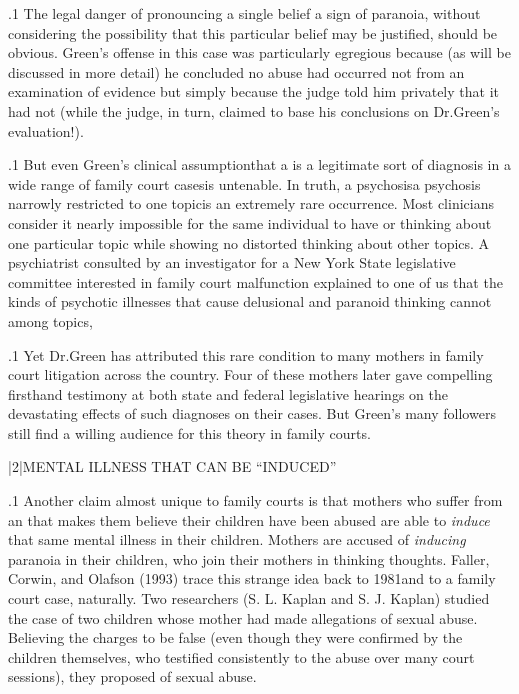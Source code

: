 \documentclass[11pt, twoside]{article}
\begin{document}
{\p.1{%
The legal danger of pronouncing a single belief a sign of
paranoia, without considering the possibility that this particular belief
may be justified, should be obvious. Green’s offense in this case was
particularly egregious because (as will be discussed in more detail) he
concluded no abuse had occurred not from an examination of evidence but simply because the judge told him privately that it had not
(while the judge, in turn, claimed to base his conclusions on Dr.\@ Green’s
evaluation!).
}%

\p.1{%
But even Green’s clinical assumption\mdash{}that a  is a legitimate sort of diagnosis in a wide range of family court
cases\mdash{}is untenable. In truth, a  psychosis\mdash{}a psychosis
narrowly restricted to one topic\mdash{}is an extremely rare occurrence. Most
clinicians consider it nearly impossible for the same individual to have
 or  thinking about one particular topic while
showing no distorted thinking about other topics. A psychiatrist consulted by an investigator for a New York State legislative committee
interested in family court malfunction explained to one of us that the
kinds of psychotic illnesses that cause delusional and paranoid thinking
cannot  among topics, 
}%

\p.1{%
Yet Dr.\@ Green has attributed this rare condition to many mothers in family court litigation across the country. Four of these mothers later gave
compelling firsthand testimony at both state and federal legislative hearings on the devastating effects of such diagnoses on their cases. But
Green’s many followers still find a willing audience for this theory in
family courts.
}%


\s|2|{MENTAL ILLNESS THAT CAN BE ``INDUCED''}

\p.1{%
\noindent{}Another claim almost unique to family courts is that mothers who suffer from an  that makes them believe their children have been
abused are able to \textit{induce} that same mental illness in their children.
Mothers are accused of \textit{inducing} paranoia in their children, who join
their mothers in thinking  thoughts. Faller, Corwin, and Olafson (1993) trace this strange idea back to 1981\mdash{}and to a family court
case, naturally. Two researchers (S. L. Kaplan and S. J. Kaplan)
studied the case of two children whose mother had made allegations of
sexual abuse. Believing the charges to be false (even though they were
confirmed by the children themselves, who testified consistently to the
abuse over many court sessions), they proposed 
of sexual abuse.
}%

}
\end{document}

